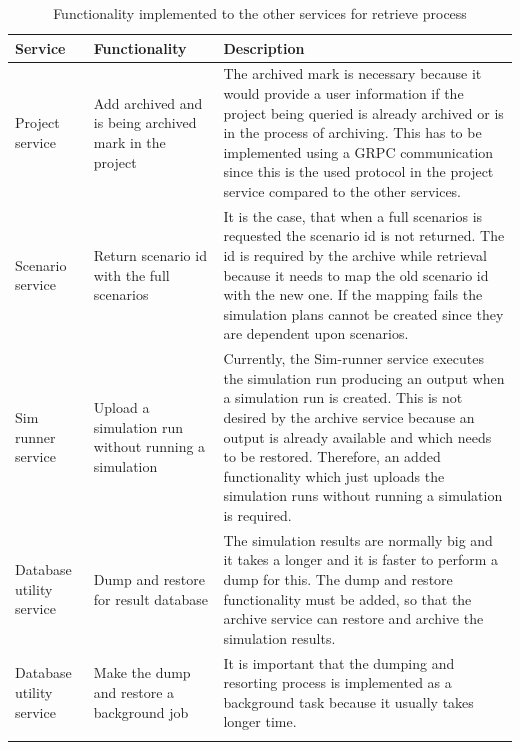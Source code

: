     \begin{longtable}{|p{2cm}|p{6cm}|p{6cm}|}
        \hline
            \textbf{Service}  & \textbf{Functionality} & \textbf{Description}\\
        \hline
            Project service & Add archived and is being archived mark in the project &  The archived mark is necessary because
            it would provide a user information if the project being queried is already archived or is in the process of archiving. This has to be
            implemented using a GRPC communication since this is the used protocol in the project service compared to the other services.  \\
        \hline
            Scenario service & Return scenario id with the full scenarios & It is the case, that when a full scenarios is requested the scenario id is
            not returned. The id is required by the archive while retrieval because it needs to map the old scenario id with the new one. If the mapping
            fails the simulation plans cannot be created since they are dependent upon scenarios.\\
        \hline
            Sim runner service & Upload a simulation run without running a simulation & Currently, the Sim-runner service executes the simulation run producing an
            output when a simulation run is created. This is not desired by the archive service because an output is already available and which needs to be restored. Therefore, an added 
            functionality which just uploads the simulation runs without running a simulation is required.\\
        \hline
            Database utility service & Dump and restore for result database & The simulation results are normally big and it takes a longer and it is faster to
            perform a dump for this. The dump and restore functionality must be added, so that the archive service can restore and archive the simulation results.\\
        \hline
            Database utility service & Make the dump and restore a background job & It is important that the dumping and resorting process is implemented as a background task
            because it usually takes longer time.\\

        \hline
        \caption{Functionality implemented to the other services for retrieve process}
        \label{table:funcRestore} 
    \end{longtable}

